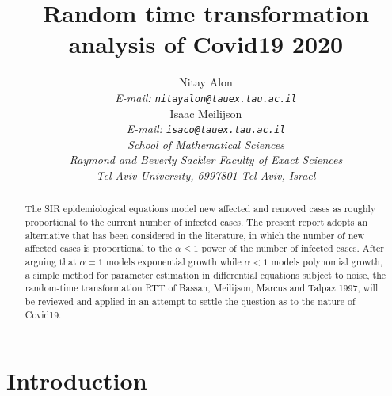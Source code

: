 \documentclass{article}
\begin{document}
\title {Random time transformation analysis of Covid19 2020 \\
}

\author {
Nitay Alon
\\
{\em E-mail: \tt{nitayalon@tauex.tau.ac.il}} \\
Isaac Meilijson
\\
{\em E-mail: \tt{isaco@tauex.tau.ac.il}} \\
{\em School of Mathematical Sciences} \\
{\em Raymond and Beverly Sackler Faculty of Exact Sciences} \\
{\em Tel-Aviv University, 6997801 Tel-Aviv, Israel} \\
}


\maketitle


\begin{abstract}
\noindent The SIR epidemiological equations model new affected and removed cases as roughly proportional to the current number of infected cases. The present report adopts an alternative that has been considered in the literature, in which the number of new affected cases is proportional to the $\alpha \le 1$ power of the number of infected cases. After arguing that $\alpha=1$ models exponential growth while $\alpha<1$ models polynomial growth, a simple method for parameter estimation in differential equations subject to noise, the random-time transformation RTT of Bassan, Meilijson, Marcus and Talpaz 1997, will be reviewed and applied in an attempt to settle the question as to the nature of Covid19.

%
\end{abstract}





\section{Introduction} \label{introduction}
\end{document}
